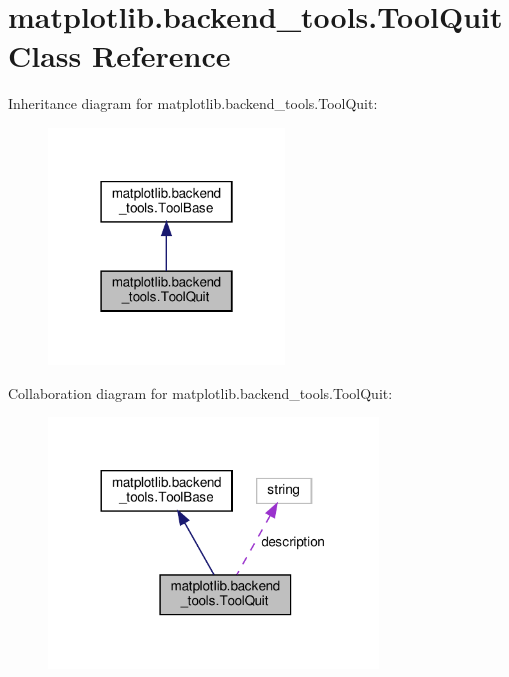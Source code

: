 \hypertarget{classmatplotlib_1_1backend__tools_1_1ToolQuit}{}\section{matplotlib.\+backend\+\_\+tools.\+Tool\+Quit Class Reference}
\label{classmatplotlib_1_1backend__tools_1_1ToolQuit}


Inheritance diagram for matplotlib.\+backend\+\_\+tools.\+Tool\+Quit\+:
\nopagebreak
\begin{figure}[H]
\begin{center}
\leavevmode
\includegraphics[width=178pt]{classmatplotlib_1_1backend__tools_1_1ToolQuit__inherit__graph}
\end{center}
\end{figure}


Collaboration diagram for matplotlib.\+backend\+\_\+tools.\+Tool\+Quit\+:
\nopagebreak
\begin{figure}[H]
\begin{center}
\leavevmode
\includegraphics[width=248pt]{classmatplotlib_1_1backend__tools_1_1ToolQuit__coll__graph}
\end{center}
\end{figure}
